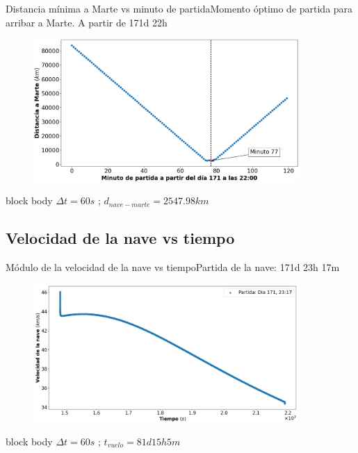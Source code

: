 \documentclass{beamer}
\begin{document}
            \begin{frame}{Distancia mínima a Marte vs minuto de partida}{Momento óptimo de partida para arribar a Marte. A partir de 171d 22h}
                \begin{figure}[H!]
                    \includegraphics[width=0.9\textwidth]{./distancia_a_marte_vs_minuto_de_partida}
                    \label{fig:marte_7}
                \end{figure}
                \begin{beamercolorbox}[sep=5pt,center]{block body}
                    \centering
                    \small{$\Delta t = 60s$ ; $d_{nave-marte} = 2547.98 km$}
                \end{beamercolorbox}
            \end{frame}

        \subsection{Velocidad de la nave vs tiempo}

            \begin{frame}{Módulo de la velocidad de la nave vs tiempo}{Partida de la nave: 171d 23h 17m}
                \begin{figure}[H!]
                    \includegraphics[width=0.9\textwidth]{./velocity_vs_time_for_travel_to_mars}
                    \label{fig:marte_8}
                \end{figure}
                \begin{beamercolorbox}[sep=5pt,center]{block body}
                    \centering
                    \small{$\Delta t = 60s$ ; $t_{vuelo} = 81d 15h 5m$}
                \end{beamercolorbox}
            \end{frame}
\end{document}
